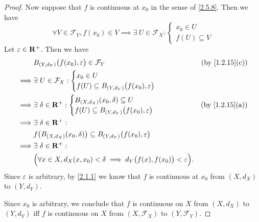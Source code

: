 \begin{proof}
  Now suppose that \(f\) is continuous at \(x_0\) in the sense of \cref{2.5.8}.
  Then we have
  \[
    \forall V \in \mathcal{F}_Y, f(x_0) \in V \implies \exists\ U \in \mathcal{F}_X : \begin{cases}
      x_0 \in U \\
      f(U) \subseteq V
    \end{cases}
  \]
  Let \(\varepsilon \in \mathbf{R}^+\).
  Then we have
  \begin{align*}
             & B_{(Y, d_Y)}\big(f(x_0), \varepsilon\big) \in \mathcal{F}_Y                                       & \text{(by \cref{1.2.15}(c))} \\
    \implies & \exists\ U \in \mathcal{F}_X : \begin{cases}
                                                x_0 \in U \\
                                                f(U) \subseteq B_{(Y, d_Y)}\big(f(x_0), \varepsilon\big)
                                              \end{cases}                                           \\
    \implies & \exists\ \delta \in \R^+ : \begin{cases}
                                            B_{(X, d_X)}(x_0, \delta) \subseteq U \\
                                            f(U) \subseteq B_{(Y, d_Y)}\big(f(x_0), \varepsilon\big)
                                          \end{cases}                                          & \text{(by \cref{1.2.15}(a))}                   \\
    \implies & \exists\ \delta \in \R^+ :                                                                                                       \\
             & f\big(B_{(X, d_X)}(x_0, \delta)\big) \subseteq B_{(Y, d_Y)}\big(f(x_0), \varepsilon\big)                                         \\
    \implies & \exists\ \delta \in \R^+ :                                                                                                       \\
             & \Big(\forall x \in X, d_X(x, x_0) < \delta \implies d_Y\big(f(x), f(x_0)\big) < \varepsilon\Big).
  \end{align*}
  Since \(\varepsilon\) is arbitrary, by \cref{2.1.1} we know that \(f\) is continuous at \(x_0\) from \((X, d_X)\) to \((Y, d_Y)\).

  Since \(x_0\) is arbitrary, we conclude that \(f\) is continuous on \(X\) from \((X, d_X)\) to \((Y, d_Y)\) iff \(f\) is continuous on \(X\) from \((X, \mathcal{F}_X)\) to \((Y, \mathcal{F}_Y)\).
\end{proof}

